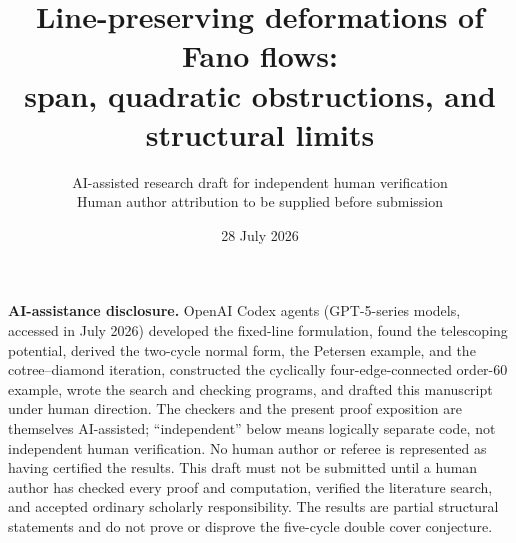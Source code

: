 \documentclass[11pt]{article}
\title{Line-preserving deformations of Fano flows:\\
span, quadratic obstructions, and structural limits}
\author{AI-assisted research draft for independent human verification\\
\small Human author attribution to be supplied before submission}
\date{28 July 2026}
\theoremstyle{definition}
\theoremstyle{remark}
\begin{document}
\maketitle

\noindent
\colorbox{yellow!22}{%
  \parbox{\dimexpr\linewidth-2\fboxsep\relax}{%
  \textbf{AI-assistance disclosure.}
  OpenAI Codex agents (GPT-5-series models, accessed in July 2026)
  developed the fixed-line formulation, found the telescoping potential,
  derived the two-cycle normal form, the Petersen example, and the
  cotree--diamond iteration, constructed the cyclically
  four-edge-connected order-60 example, wrote the search and checking
  programs, and drafted this manuscript under human direction.  The
  checkers and the present proof exposition are themselves
  AI-assisted; ``independent'' below means logically separate code, not
  independent human verification.  No human author or referee is represented
  as having certified the results.  This draft must not be submitted until a
  human author has checked every proof and computation, verified the
  literature search, and accepted ordinary scholarly responsibility.  The
  results are partial structural statements and do not prove or disprove the
  five-cycle double cover conjecture.}}
\end{document}
